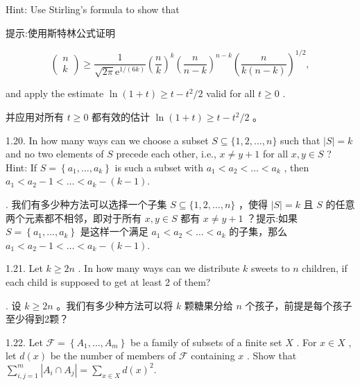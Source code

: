 \documentclass[10pt]{article}
\begin{document}
Hint: Use Stirling's formula to show that

\begin{tcolorbox}\relax
提示:使用斯特林公式证明
\end{tcolorbox}

\[
\left( \begin{array}{l} n \\  k \end{array}\right)  \geq  \frac{1}{\sqrt{2\pi }{\mathrm{e}}^{1/\left( {6k}\right) }}{\left( \frac{n}{k}\right) }^{k}{\left( \frac{n}{n - k}\right) }^{n - k}{\left( \frac{n}{k\left( {n - k}\right) }\right) }^{1/2},
\]

and apply the estimate \(\ln \left( {1 + t}\right)  \geq  t - {t}^{2}/2\) valid for all \(t \geq  0\) .

\begin{tcolorbox}\relax
并应用对所有 \(t \geq  0\) 都有效的估计 \(\ln \left( {1 + t}\right)  \geq  t - {t}^{2}/2\) 。
\end{tcolorbox}

1.20. In how many ways can we choose a subset \(S \subseteq  \{ 1,2,\ldots ,n\}\) such that \(\left| S\right|  = k\) and no two elements of \(S\) precede each other, i.e., \(x \neq  y + 1\) for all \(x,y \in  S\) ? Hint: If \(S = \left\{  {{a}_{1},\ldots ,{a}_{k}}\right\}\) is such a subset with \({a}_{1} < {a}_{2} < \ldots  < {a}_{k}\) , then \({a}_{1} < {a}_{2} - 1 < \ldots  < {a}_{k} - \left( {k - 1}\right) .\)

\begin{tcolorbox}. 我们有多少种方法可以选择一个子集 \(S \subseteq  \{ 1,2,\ldots ,n\}\) ，使得 \(\left| S\right|  = k\) 且 \(S\) 的任意两个元素都不相邻，即对于所有 \(x,y \in  S\) 都有 \(x \neq  y + 1\) ？提示:如果 \(S = \left\{  {{a}_{1},\ldots ,{a}_{k}}\right\}\) 是这样一个满足 \({a}_{1} < {a}_{2} < \ldots  < {a}_{k}\) 的子集，那么 \({a}_{1} < {a}_{2} - 1 < \ldots  < {a}_{k} - \left( {k - 1}\right) .\)
\end{tcolorbox}

1.21. Let \(k \geq  {2n}\) . In how many ways can we distribute \(k\) sweets to \(n\) children, if each child is supposed to get at least 2 of them?

\begin{tcolorbox}. 设 \(k \geq  {2n}\) 。我们有多少种方法可以将 \(k\) 颗糖果分给 \(n\) 个孩子，前提是每个孩子至少得到2颗？
\end{tcolorbox}

1.22. Let \(\mathcal{F} = \left\{  {{A}_{1},\ldots ,{A}_{m}}\right\}\) be a family of subsets of a finite set \(X\) . For \(x \in  X\) , let \(d\left( x\right)\) be the number of members of \(\mathcal{F}\) containing \(x\) . Show that \(\mathop{\sum }\limits_{{i,j = 1}}^{m}\left| {{A}_{i} \cap  {A}_{j}}\right|  = \mathop{\sum }\limits_{{x \in  X}}d{\left( x\right) }^{2}.\)
\end{document}
